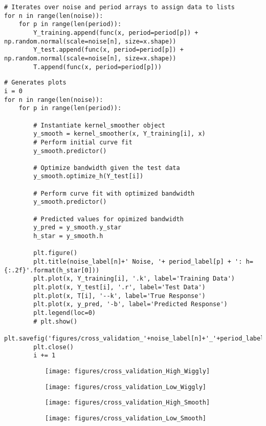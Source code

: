 \documentclass[10pt]{article}
\begin{document}
\begin{enumerate}[label=(\Alph*)]
        \begin{lstlisting}
# Iterates over noise and period arrays to assign data to lists
for n in range(len(noise)):
    for p in range(len(period)):
        Y_training.append(func(x, period=period[p]) + np.random.normal(scale=noise[n], size=x.shape))
        Y_test.append(func(x, period=period[p]) + np.random.normal(scale=noise[n], size=x.shape))
        T.append(func(x, period=period[p]))

        \end{lstlisting}

        \begin{lstlisting}
# Generates plots 
i = 0
for n in range(len(noise)):
    for p in range(len(period)):

        # Instantiate kernel_smoother object
        y_smooth = kernel_smoother(x, Y_training[i], x)
        # Perform initial curve fit
        y_smooth.predictor()

        # Optimize bandwidth given the test data
        y_smooth.optimize_h(Y_test[i])

        # Perform curve fit with optimized bandwidth
        y_smooth.predictor()

        # Predicted values for opimized bandwidth
        y_pred = y_smooth.y_star
        h_star = y_smooth.h

        plt.figure()
        plt.title(noise_label[n]+' Noise, '+ period_label[p] + ': h={:.2f}'.format(h_star[0]))
        plt.plot(x, Y_training[i], '.k', label='Training Data')
        plt.plot(x, Y_test[i], '.r', label='Test Data')
        plt.plot(x, T[i], '--k', label='True Response')
        plt.plot(x, y_pred, '-b', label='Predicted Response')
        plt.legend(loc=0)
        # plt.show()
        plt.savefig('figures/cross_validation_'+noise_label[n]+'_'+period_label[p]+'.pdf')
        plt.close()
        i += 1

        \end{lstlisting}

        \begin{figure}
            \begin{subfigure}{.5\textwidth}
              \centering
              \texttt{[image: figures/cross\_validation\_High\_Wiggly]}
            \end{subfigure}%
            \begin{subfigure}{.5\textwidth}
              \centering
              \texttt{[image: figures/cross\_validation\_Low\_Wiggly]}
            \end{subfigure}
            \hspace{-20pt}
            \begin{subfigure}{.5\textwidth}
              \centering
              \texttt{[image: figures/cross\_validation\_High\_Smooth]}
            \end{subfigure}%
            \begin{subfigure}{.5\textwidth}
              \centering
              \texttt{[image: figures/cross\_validation\_Low\_Smooth]}
            \end{subfigure}


\end{figure}
\end{enumerate}
\end{document}
